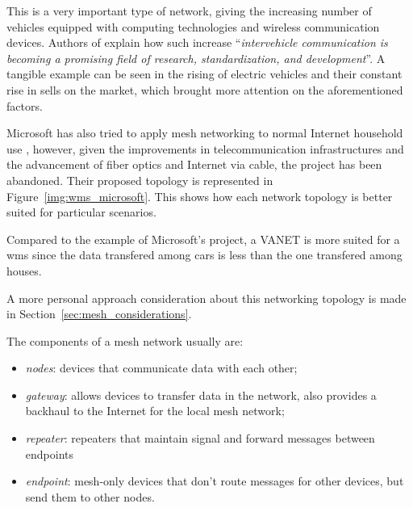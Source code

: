		This is a very important type of network, giving the increasing number of vehicles equipped with computing technologies and wireless communication devices.
		Authors of \cite{BADIS2015653} explain how such increase ``\textit{intervehicle communication is becoming a promising field of research, standardization, and development}''.
		A tangible example can be seen in the rising of electric vehicles and their constant rise in sells on the market, which brought more attention on the aforementioned factors.
		
		Microsoft has also tried to apply mesh networking to normal Internet household use \cite{bahl2009opportunistic}, however, given the improvements in telecommunication infrastructures and the advancement of fiber optics and Internet via cable, the project has been abandoned.
		Their proposed topology is represented in Figure~\ref{img:wms_microsoft}.
		This shows how each network topology is better suited for particular scenarios.
		
		Compared to the example of Microsoft's project, a VANET is more suited for a wms since the data transfered among cars is less than the one transfered among houses.
		
		A more personal approach consideration about this networking topology is made in Section~\ref{sec:mesh_considerations}.
				
		
		The components of a mesh network usually are:
		\begin{itemize}
			\item \textit{nodes}: devices that communicate data with each other;
			\item \textit{gateway}: allows devices to transfer data in the network, also provides a backhaul to the Internet for the local mesh network;
			\item \textit{repeater}: repeaters that maintain signal and forward messages between endpoints
			\item \textit{endpoint}: mesh-only devices that don't route messages for other devices, but send them to other nodes.
		\end{itemize}
		\vspace*{-\baselineskip}

